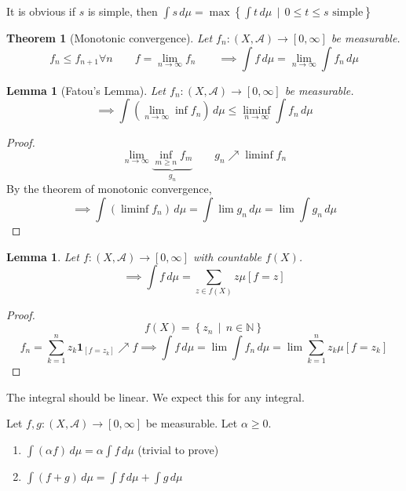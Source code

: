 \documentclass[a4paper]{article}
\newcounter{lecref}[section]
\numberwithin{lecref}{section}
\theoremstyle{break}
\newtheorem*{Theorem}{Theorem}
\newtheorem{lemma}[lecref]{Lemma}
\newtheorem*{Lemma}{Lemma}
\newcommand{\SetDef}[2]{\left\{#1\,\mid\,#2\right\}}
\begin{document}
It is obvious if $s$ is simple, then $\int s \, d\mu = \max\SetDef{\int t \, d\mu}{0 \leq t \leq s \text{ simple}}$

\begin{Theorem}[Monotonic convergence]
  Let $f_n: (X, \mathcal A) \to [0, \infty]$ be measurable.
  \[ f_n \leq f_{n+1} \forall n \qquad f = \lim_{n\to\infty} f_n \qquad \implies \int f \, d\mu = \lim_{n\to\infty} \int f_n \, d\mu \]
\end{Theorem}

\begin{Lemma}[Fatou's Lemma]
  Let $f_n: (X, \mathcal A) \to [0, \infty]$ be measurable.
  \[ \implies \int \left(\lim_{n\to\infty} \inf{f_n}\right) \, d\mu \leq \liminf_{n\to\infty} \int f_n \, d\mu \]
\end{Lemma}

\begin{proof}
  \[ \lim_{n\to\infty} \underbrace{\inf_{m \geq n} f_m}_{g_n} \qquad g_n \nearrow \liminf f_n \]
  By the theorem of monotonic convergence,
  \[ \implies \int \left(\liminf f_n\right) \, d\mu = \int \lim{g_n} \, d\mu = \lim \int g_n \, d\mu \]
\end{proof}

\begin{lemma}
  Let $f: (X, \mathcal A) \to [0, \infty]$ with countable $f(X)$.
  \[ \implies \int f \, d\mu = \sum_{z \in f(X)} z \mu[f = z] \]
\end{lemma}

\begin{proof}
  \[ f(X) = \SetDef{z_n}{n \in \mathbb N} \]
  \[ f_n = \sum_{k=1}^n z_k \mathbf{1}_{[f = z_k]} \nearrow f \implies \int f \, d\mu = \lim \int f_n \, d\mu = \lim \sum_{k=1}^n z_k \mu[f = z_k] \]
\end{proof}

The integral should be linear. We expect this for any integral.

\begin{theorem}
  Let $f, g: (X, \mathcal A) \to [0, \infty]$ be measurable. Let $\alpha \geq 0$.
  \begin{enumerate}
    \item $\int (\alpha f) \, d\mu = \alpha \int f \, d\mu$ (trivial to prove)
    \item $\int (f + g) \, d\mu = \int f \, d\mu + \int g \, d\mu$
  \end{enumerate}
\end{theorem}
\end{document}
